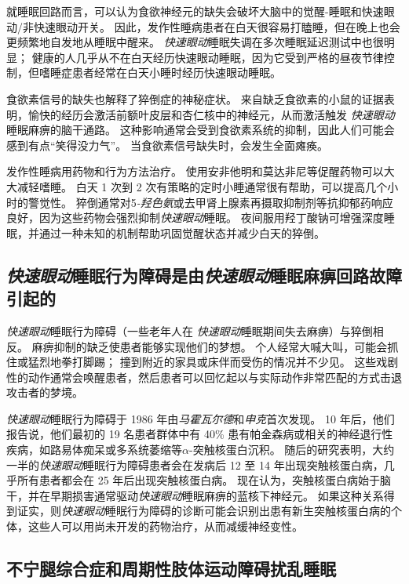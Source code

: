 就睡眠回路而言，可以认为食欲神经元的缺失会破坏大脑中的觉醒-睡眠和快速眼动/非快速眼动开关。
因此，发作性睡病患者在白天很容易打瞌睡，但在晚上也会更频繁地自发地从睡眠中醒来。
\textit{快速眼动}睡眠失调在多次睡眠延迟测试中也很明显；
健康的人几乎从不在白天经历快速眼动睡眠，因为它受到严格的昼夜节律控制，但嗜睡症患者经常在白天小睡时经历快速眼动睡眠。


食欲素信号的缺失也解释了猝倒症的神秘症状。
来自缺乏食欲素的小鼠的证据表明，愉快的经历会激活前额叶皮层和杏仁核中的神经元，从而激活触发 \textit{快速眼动}睡眠麻痹的脑干通路。
这种影响通常会受到食欲素系统的抑制，因此人们可能会感到有点“笑得没力气”。
当食欲素信号缺失时，会发生全面瘫痪。


发作性睡病用药物和行为方法治疗。
使用安非他明和莫达非尼等促醒药物可以大大减轻嗜睡。
白天 1 次到 2 次有策略的定时小睡通常很有帮助，可以提高几个小时的警觉性。
猝倒通常对5\textit{-羟色氨}或去甲肾上腺素再摄取抑制剂等抗抑郁药响应良好，因为这些药物会强烈抑制\textit{快速眼动}睡眠。
夜间服用羟丁酸钠可增强深度睡眠，并通过一种未知的机制帮助巩固觉醒状态并减少白天的猝倒。



\subsection{\textit{快速眼动}睡眠行为障碍是由\textit{快速眼动}睡眠麻痹回路故障引起的}

\textit{快速眼动}睡眠行为障碍（一些老年人在 \textit{快速眼动}睡眠期间失去麻痹）与猝倒相反。
麻痹抑制的缺乏使患者能够实现他们的梦想。
个人经常大喊大叫，可能会抓住或猛烈地拳打脚踢；
撞到附近的家具或床伴而受伤的情况并不少见。
这些戏剧性的动作通常会唤醒患者，然后患者可以回忆起以与实际动作非常匹配的方式击退攻击者的梦境。


\textit{快速眼动}睡眠行为障碍于 1986 年由\textit{马霍瓦尔德}和\textit{申克}首次发现。
10 年后，他们报告说，他们最初的 19 名患者群体中有 40\% 患有帕金森病或相关的神经退行性疾病，如路易体痴呆或多系统萎缩等$ \alpha $-突触核蛋白沉积。
随后的研究表明，大约一半的\textit{快速眼动}睡眠行为障碍患者会在发病后 12 至 14 年出现突触核蛋白病，几乎所有患者都会在 25 年后出现突触核蛋白病。
现在认为，突触核蛋白病始于脑干，并在早期损害通常驱动\textit{快速眼动}睡眠麻痹的蓝核下神经元。
如果这种关系得到证实，则\textit{快速眼动}睡眠行为障碍的诊断可能会识别出患有新生突触核蛋白病的个体，这些人可以用尚未开发的药物治疗，从而减缓神经变性。



\subsection{不宁腿综合症和周期性肢体运动障碍扰乱睡眠}

